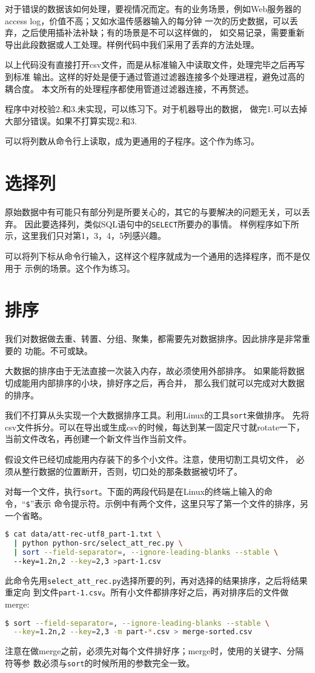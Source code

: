 \documentclass[11pt]{article}
\newcommand{\id}[1]{\texttt{#1}}
\begin{document}
对于错误的数据该如何处理，要视情况而定。有的业务场景，例如Web服务器的
access log，价值不高；又如水温传感器输入的每分钟
一次的历史数据，可以丢弃，之后使用插补法补缺；有的场景是不可以这样做的，
如交易记录，需要重新导出此段数据或人工处理。样例代码中我们采用了丢弃的方法处理。

以上代码没有直接打开csv文件，而是从标准输入中读取文件，处理完毕之后再写到标准
输出。这样的好处是便于通过管道过滤器连接多个处理进程，避免过高的耦合度。
本文所有的处理程序都使用管道过滤器连接，不再赘述。

程序中对校验2.和3.未实现，可以练习下。对于机器导出的数据，
做完1.可以去掉大部分错误。如果不打算实现2.和3.

可以将列数从命令行上读取，成为更通用的子程序。这个作为练习。

\section{选择列}
原始数据中有可能只有部分列是所要关心的，其它的与要解决的问题无关，可以丢弃。
因此要选择列，类似SQL语句中的\id{SELECT}所要办的事情。
样例程序如下所示，这里我们只对第1，3，4，5列感兴趣。


可以将列下标从命令行输入，这样这个程序就成为一个通用的选择程序，而不是仅用于
示例的场景。这个作为练习。


\section{排序}
我们对数据做去重、转置、分组、聚集，都需要先对数据排序。因此排序是非常重要的
功能。不可或缺。

大数据的排序由于无法直接一次装入内存，故必须使用外部排序。
如果能将数据切成能用内部排序的小块，排好序之后，再合并，
那么我们就可以完成对大数据的排序。

我们不打算从头实现一个大数据排序工具。利用Linux的工具\id{sort}来做排序。
先将csv文件拆分。可以在导出或生成csv的时候，每达到某一固定尺寸就rotate一下，
当前文件改名，再创建一个新文件当作当前文件。

假设文件已经切成能用内存装下的多个小文件。注意，使用切割工具切文件，
必须从整行数据的位置断开，否则，切口处的那条数据被切坏了。

对每一个文件，执行\id{sort}。下面的两段代码是在Linux的终端上输入的命令，“\id{\$}”表示
命令提示符。示例中有两个文件，这里只写了第一个文件的排序，另一个省略。
\begin{lstlisting}[language=sh]
$ cat data/att-rec-utf8_part-1.txt \ 
  | python python-src/select_att_rec.py \ 
  | sort --field-separator=, --ignore-leading-blanks --stable \ 
  --key=1.2n,2 --key=2,3 >part-1.csv
\end{lstlisting}
此命令先用\id{select\_att\_rec.py}选择所要的列，再对选择的结果排序，之后将结果重定向
到文件\id{part-1.csv}。所有小文件都排序好之后，再对排序后的文件做merge:
\begin{lstlisting}[language=sh]
$ sort --field-separator=, --ignore-leading-blanks --stable \
  --key=1.2n,2 --key=2,3 -m part-*.csv > merge-sorted.csv
\end{lstlisting}
注意在做merge之前，必须先对每个文件排好序；merge时，使用的关键字、分隔符等参
数必须与\id{sort}的时候所用的参数完全一致。
\end{document}
